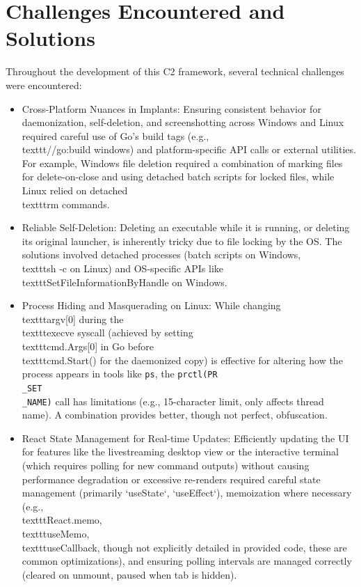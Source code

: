 \section{Challenges Encountered and Solutions}
Throughout the development of this C2 framework, several technical challenges were encountered:
\begin{itemize}
    \item Cross-Platform Nuances in Implants: Ensuring consistent behavior for daemonization, self-deletion, and screenshotting across Windows and Linux required careful use of Go's build tags (e.g., \\texttt{//go:build windows}) and platform-specific API calls or external utilities. For example, Windows file deletion required a combination of marking files for delete-on-close and using detached batch scripts for locked files, while Linux relied on detached \\texttt{rm} commands.
    \item Reliable Self-Deletion: Deleting an executable while it is running, or deleting its original launcher, is inherently tricky due to file locking by the OS. The solutions involved detached processes (batch scripts on Windows, \\texttt{sh -c} on Linux) and OS-specific APIs like \\texttt{SetFileInformationByHandle} on Windows.
    \item Process Hiding and Masquerading on Linux: While changing \\texttt{argv[0]} during the \\texttt{execve} syscall (achieved by setting \\texttt{cmd.Args[0]} in Go before \\texttt{cmd.Start()} for the daemonized copy) is effective for altering how the process appears in tools like \texttt{ps}, the \texttt{prctl(PR\\_SET\\_NAME)} call has limitations (e.g., 15-character limit, only affects thread name). A combination provides better, though not perfect, obfuscation.
    \item React State Management for Real-time Updates: Efficiently updating the UI for features like the livestreaming desktop view or the interactive terminal (which requires polling for new command outputs) without causing performance degradation or excessive re-renders required careful state management (primarily `useState`, `useEffect`), memoization where necessary (e.g., \\texttt{React.memo}, \\texttt{useMemo}, \\texttt{useCallback}, though not explicitly detailed in provided code, these are common optimizations), and ensuring polling intervals are managed correctly (cleared on unmount, paused when tab is hidden).

\end{itemize}
